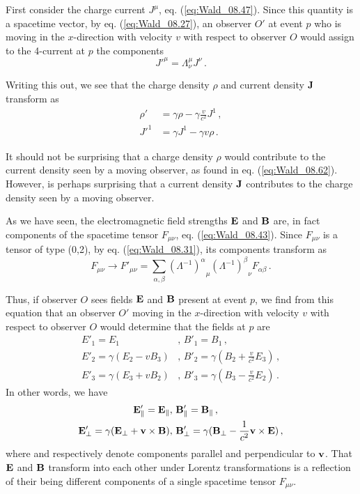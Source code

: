 First consider the charge current $J^\mu$, eq. (\ref{eq:Wald_08.47}). Since this quantity is a spacetime vector, by eq. (\ref{eq:Wald_08.27}), an observer $O'$ at event $p$ who is moving in the $x$-direction with velocity $v$ with respect to observer $O$ would assign to the 4-current at $p$ the components 
\begin{equation}\label{eq:Wald_08.60}
{J'}^\mu = \Lambda^\mu_\nu J^\nu \,.
\end{equation}

Writing this out, we see that the charge density $\rho$ and current density $\vb{J}$ transform as
\begin{align}
\rho' &= \gamma \rho - \gamma \frac{v}{c^2} J^1\,, \label{eq:Wald_08.61}\\
{J'}^1 &= \gamma J^1 - \gamma v \rho \,. \label{eq:Wald_08.62}
\end{align}

It should not be surprising that a charge density $\rho$ would contribute to the current density seen by a moving observer, as found in eq. (\ref{eq:Wald_08.62}). However, is perhaps surprising that a current density $\vb{J}$ contributes to the charge density seen by a moving observer. 

As we have seen, the electromagnetic field strengths $\vb{E}$ and $\vb{B}$ are, in fact components of the spacetime tensor $F_{\mu \nu}$, eq. (\ref{eq:Wald_08.43}). Since $F_{\mu \nu}$ is a tensor of type (0,2), by eq. (\ref{eq:Wald_08.31}), its components transform as 
\begin{equation}\label{eq:Wald_08.63}
F_{\mu \nu} \rightarrow F'_{\mu \nu} = \sum_{\alpha, \beta} {(\Lambda^{-1})^\alpha}_\mu {(\Lambda^{-1})^\beta}_\nu F_{\alpha \beta} \,.
\end{equation}

Thus, if observer $O$ sees fields $\vb{E}$ and $\vb{B}$ present at event $p$, we find from this equation that an observer $O'$ moving in the $x$-direction with velocity $v$ with respect to observer $O$ would determine that the fields at $p$ are 
\begin{align}
E'_1 = E_1     &,\, B'_1 = B_1\,,\label{eq:Wald_08.64}\\
E'_2 = \gamma (E_2 - v B_3)&,\, B'_2 = \gamma \left(B_2 + \frac{v}{c^2} E_3\right)\,,\label{eq:Wald_08.65}\\
E'_3 = \gamma (E_3 + v B_2) &,\, B'_3 = \gamma \left(B_3 - \frac{v}{c^2} E_2\right)\,.\label{eq:Wald_08.66}
\end{align}
In other words, we have 
\begin{align}
\vb{E}'_\parallel = \vb{E}_\parallel &,\, \vb{B}'_\parallel = \vb{B}_\parallel\,,\label{eq:Wald_08.67}\\
\vb{E}'_\perp = \gamma (\vb{E}_\perp + \vb{v} \times \vb{B})  &,\, \vb{B}'_\perp = \gamma (\vb{B}_\perp - \frac{1}{c^2} \vb{v} \times \vb{E})\,,\label{eq:Wald_08.68}
\end{align}
where \quotes{$\parallel$} and \quotes{$\perp$} respectively denote components parallel and perpendicular to $\vb{v}$. That $\vb{E}$ and $\vb{B}$ transform into each other under Lorentz transformations is a reflection of their being different components of a single spacetime tensor $F_{\mu \nu}$.

